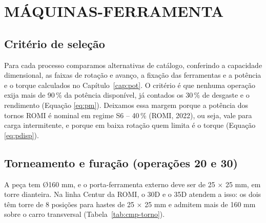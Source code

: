 \chapter{MÁQUINAS-FERRAMENTA}

\section{Critério de seleção}\label{sec:crit90}

Para cada processo comparamos alternativas de catálogo, conferindo a capacidade dimensional, as faixas de rotação e avanço, a fixação das ferramentas e a potência e o torque calculados no Capítulo~\ref{cap:pot}. O critério é que nenhuma operação exija mais de 90\,\% da potência disponível, já contados os 30\,\% de desgaste e o rendimento (Equação \eqref{eq:pm}). Deixamos essa margem porque a potência dos tornos ROMI é nominal em regime S6 -- 40\,\% (ROMI, 2022), ou seja, vale para carga intermitente, e porque em baixa rotação quem limita é o torque (Equação \eqref{eq:pdisp}).

\section{Torneamento e furação (operações 20 e 30)}

A peça tem Ø160 mm, e o porta-ferramenta externo deve ser de 25 $\times$ 25 mm, em torre dianteira. Na linha Centur da ROMI, o 30D e o 35D atendem a isso: os dois têm torre de 8 posições para hastes de 25 $\times$ 25 mm e admitem mais de 160 mm sobre o carro transversal (Tabela~\ref{tab:cmp-torno}).

